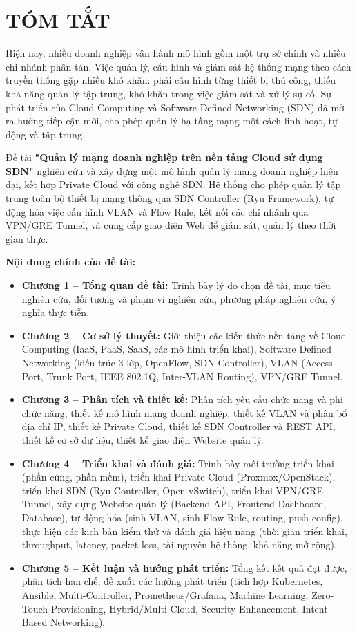 \section*{TÓM TẮT}

Hiện nay, nhiều doanh nghiệp vận hành mô hình gồm một trụ sở chính và nhiều chi nhánh phân tán. Việc quản lý, cấu hình và giám sát hệ thống mạng theo cách truyền thống gặp nhiều khó khăn: phải cấu hình từng thiết bị thủ công, thiếu khả năng quản lý tập trung, khó khăn trong việc giám sát và xử lý sự cố. Sự phát triển của Cloud Computing và Software Defined Networking (SDN) đã mở ra hướng tiếp cận mới, cho phép quản lý hạ tầng mạng một cách linh hoạt, tự động và tập trung.

Đề tài \textbf{"Quản lý mạng doanh nghiệp trên nền tảng Cloud sử dụng SDN"} nghiên cứu và xây dựng một mô hình quản lý mạng doanh nghiệp hiện đại, kết hợp Private Cloud với công nghệ SDN. Hệ thống cho phép quản lý tập trung toàn bộ thiết bị mạng thông qua SDN Controller (Ryu Framework), tự động hóa việc cấu hình VLAN và Flow Rule, kết nối các chi nhánh qua VPN/GRE Tunnel, và cung cấp giao diện Web để giám sát, quản lý theo thời gian thực.

\textbf{Nội dung chính của đề tài:}
\begin{itemize}
    \item \textbf{Chương 1 -- Tổng quan đề tài:} Trình bày lý do chọn đề tài, mục tiêu nghiên cứu, đối tượng và phạm vi nghiên cứu, phương pháp nghiên cứu, ý nghĩa thực tiễn.
    
    \item \textbf{Chương 2 -- Cơ sở lý thuyết:} Giới thiệu các kiến thức nền tảng về Cloud Computing (IaaS, PaaS, SaaS, các mô hình triển khai), Software Defined Networking (kiến trúc 3 lớp, OpenFlow, SDN Controller), VLAN (Access Port, Trunk Port, IEEE 802.1Q, Inter-VLAN Routing), VPN/GRE Tunnel.
    
    \item \textbf{Chương 3 -- Phân tích và thiết kế:} Phân tích yêu cầu chức năng và phi chức năng, thiết kế mô hình mạng doanh nghiệp, thiết kế VLAN và phân bổ địa chỉ IP, thiết kế Private Cloud, thiết kế SDN Controller và REST API, thiết kế cơ sở dữ liệu, thiết kế giao diện Website quản lý.
    
    \item \textbf{Chương 4 -- Triển khai và đánh giá:} Trình bày môi trường triển khai (phần cứng, phần mềm), triển khai Private Cloud (Proxmox/OpenStack), triển khai SDN (Ryu Controller, Open vSwitch), triển khai VPN/GRE Tunnel, xây dựng Website quản lý (Backend API, Frontend Dashboard, Database), tự động hóa (sinh VLAN, sinh Flow Rule, routing, push config), thực hiện các kịch bản kiểm thử và đánh giá hiệu năng (thời gian triển khai, throughput, latency, packet loss, tài nguyên hệ thống, khả năng mở rộng).
    
    \item \textbf{Chương 5 -- Kết luận và hướng phát triển:} Tổng kết kết quả đạt được, phân tích hạn chế, đề xuất các hướng phát triển (tích hợp Kubernetes, Ansible, Multi-Controller, Prometheus/Grafana, Machine Learning, Zero-Touch Provisioning, Hybrid/Multi-Cloud, Security Enhancement, Intent-Based Networking).
\end{itemize}

